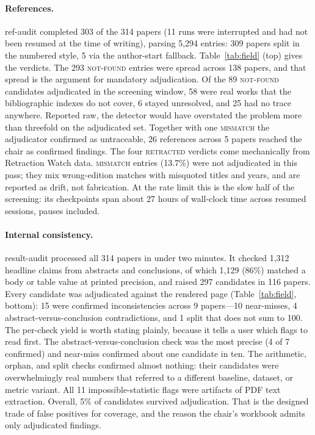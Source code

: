 \documentclass[11pt]{article}
\begin{document}
\paragraph{References.} ref-audit completed 303 of the 314 papers (11 runs
were interrupted and had not been resumed at the time of writing), parsing
5,294 entries: 309 papers split in the numbered style, 5 via the author-start
fallback. Table~\ref{tab:field} (top) gives the verdicts. The 293
\textsc{not-found} entries were spread across 138 papers, and that spread is
the argument for mandatory adjudication. Of the 89 \textsc{not-found}
candidates adjudicated in the screening window, 58 were real works that the
bibliographic indexes do not cover, 6 stayed unresolved, and 25 had no trace
anywhere. Reported raw, the detector would have overstated the problem more
than threefold on the adjudicated set. Together with one \textsc{mismatch}
the adjudicator confirmed as untraceable, 26 references across 5 papers
reached the chair as confirmed findings. The four \textsc{retracted} verdicts
come mechanically from Retraction Watch data. \textsc{mismatch} entries
(13.7\%) were not adjudicated in this pass; they mix wrong-edition matches
with misquoted titles and years, and are reported as drift, not fabrication.
At the rate limit this is the slow half of the screening: its checkpoints span
about 27 hours of wall-clock time across resumed sessions, pauses included.

\paragraph{Internal consistency.} result-audit processed all 314 papers in
under two minutes. It checked 1,312 headline claims from abstracts and
conclusions, of which 1,129 (86\%) matched a body or table value at printed
precision, and raised 297 candidates in 116 papers. Every candidate was
adjudicated against the rendered page (Table~\ref{tab:field}, bottom): 15
were confirmed inconsistencies across 9 papers---10 near-misses, 4
abstract-versus-conclusion contradictions, and 1 split that does not sum to
100. The per-check yield is worth stating plainly, because it tells a user
which flags to read first. The abstract-versus-conclusion check was the most
precise (4 of 7 confirmed) and near-miss confirmed about one candidate in ten.
The arithmetic, orphan, and split checks confirmed almost nothing: their
candidates were overwhelmingly real numbers that referred to a different
baseline, dataset, or metric variant. All 11 impossible-statistic flags were
artifacts of PDF text extraction. Overall, 5\% of candidates survived
adjudication. That is the designed trade of false positives for coverage, and
the reason the chair's workbook admits only adjudicated findings.
\end{document}

